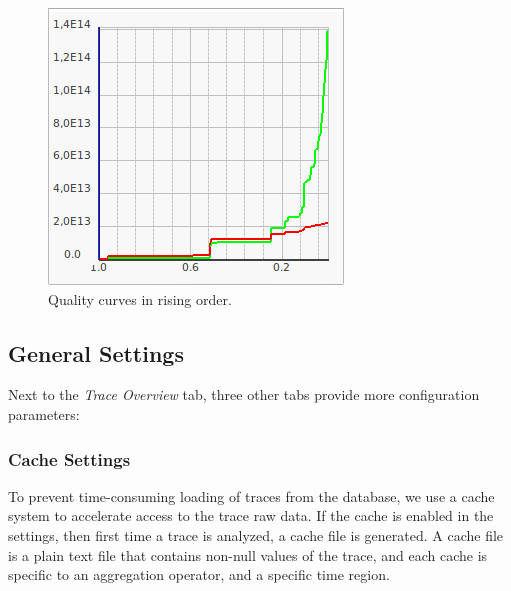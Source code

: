 \documentclass[twoside]{article}
\begin{document}
\begin{sloppypar}
\begin{figure}[h!]
	\centering
	\includegraphics[scale=0.5]{images/ocelotlCurves.png}
	\caption{Quality curves in rising order.}
	\label{aggregCurves}
\end{figure}

\subsection{General Settings}
Next to the \textit{Trace Overview} tab, three other tabs provide more configuration parameters:

\subsubsection{Cache Settings}
To prevent time-consuming loading of traces from the database, we use a cache system to accelerate access to the trace raw data. If the cache is enabled in the settings, then first time a trace is analyzed, a cache file is generated. A cache file is a plain text file that contains non-null values of the trace, and each cache is specific to an aggregation operator, and a specific time region.


\end{sloppypar}
\end{document}
